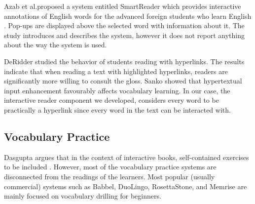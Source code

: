 	Azab et al.proposed a system entitled SmartReader which provides interactive annotations of English words for the advanced foreign students who learn English  \cite{Azab13-nlp}.
	Pop-ups are displayed above the selected word with information about it. 
	The study introduces and describes the system, however it does not report anything about the way the system is used.


	DeRidder \cite{DeRidder02-Links} studied the behavior of students reading with hyperlinks. The results indicate that when reading a text with highlighted hyperlinks, readers are significantly more willing to consult the gloss. Sanko \cite{Sanko06-Effects} showed that hypertextual input enhancement favourably affects vocabulary learning.
% 
	In our case, the interactive reader component we developed, considers every word to be practically a hyperlink since every word in the text can be interacted with. 











\subsection{Vocabulary Practice}


Dasgupta argues that in the context of interactive books, self-contained exercises to be included \cite{Dasgupta10-Play}. However, most of the vocabulary practice systems are disconnected from the readings of the learners. Most popular (usually commercial) systems such as Babbel, DuoLingo, RosettaStone, and Memrise are mainly focused on vocabulary drilling for beginners. 


